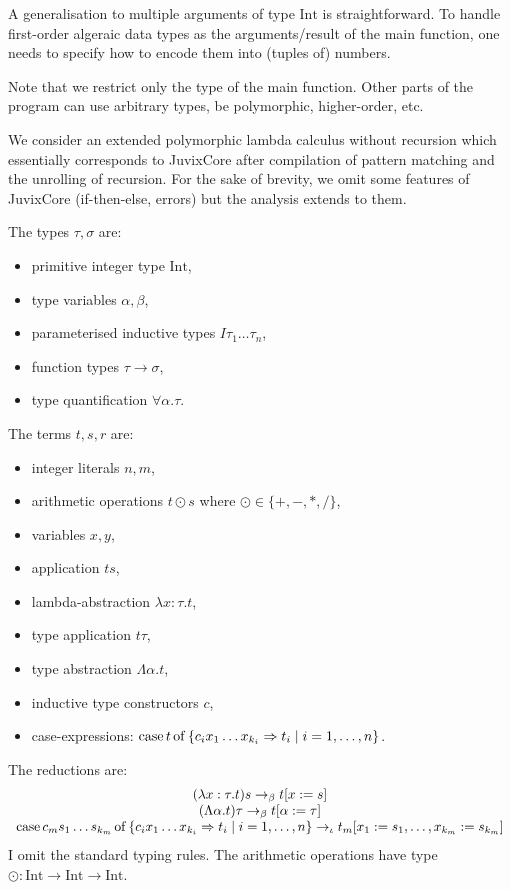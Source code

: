 A generalisation to multiple arguments of type $\mathrm{Int}$ is
straightforward. To handle first-order algeraic data types as the
arguments/result of the main function, one needs to specify how to
encode them into (tuples of) numbers.

Note that we restrict only the type of the main function. Other parts
of the program can use arbitrary types, be polymorphic, higher-order,
etc.

We consider an extended polymorphic lambda calculus without recursion
which essentially corresponds to JuvixCore after compilation of
pattern matching and the unrolling of recursion. For the sake of
brevity, we omit some features of JuvixCore (if-then-else, errors) but
the analysis extends to them.

\medskip

\noindent The types $\tau,\sigma$ are:
\begin{itemize}
\item primitive integer type $\mathrm{Int}$,
\item type variables $\alpha,\beta$,
\item parameterised inductive types $I \tau_1 \ldots \tau_n$,
\item function types $\tau \to \sigma$,
\item type quantification $\forall \alpha . \tau$.
\end{itemize}
The terms $t,s,r$ are:
\begin{itemize}
\item integer literals $n, m$,
\item arithmetic operations $t \odot s$ where $\odot \in \{ {+}, {-}, {*}, {/} \}$,
\item variables $x,y$,
\item application $t s$,
\item lambda-abstraction $\lambda x : \tau . t$,
\item type application $t \tau$,
\item type abstraction $\Lambda \alpha . t$,
\item inductive type constructors $c$,
\item case-expressions: $\mathrm{case}\,t\,\mathrm{of}\,\{ c_i x_1 \ldots x_{k_i} \Rightarrow t_i \mid i = 1,\ldots,n\}$.
\end{itemize}
The reductions are:
\[
\begin{array}{c}
  (\lambda x : \tau . t) s \to_\beta t[x := s]\\
  (\Lambda \alpha . t) \tau \to_\beta t[\alpha := \tau]\\
  \mathrm{case}\,c_m s_1 \ldots s_{k_m}\,\mathrm{of}\,\{ c_i x_1 \ldots x_{k_i} \Rightarrow t_i \mid i = 1,\ldots,n\} \to_\iota t_m[x_1 := s_1,\ldots,x_{k_m} := s_{k_m}]
\end{array}
\]
I omit the standard typing rules. The arithmetic operations
have type $\odot : \mathrm{Int} \to \mathrm{Int} \to \mathrm{Int}$.

